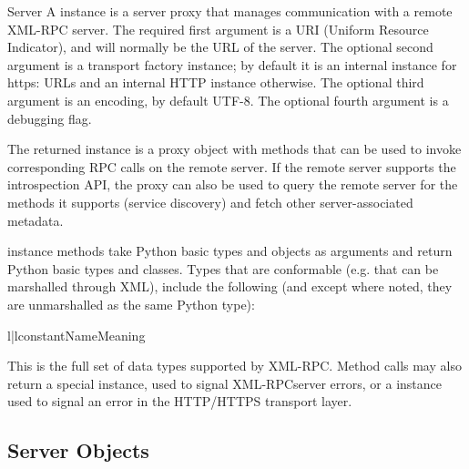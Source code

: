 \begin{classdesc}{Server}{}
A  instance is a server proxy that manages communication
with a remote XML-RPC server.  The required first argument is a URI
(Uniform Resource Indicator), and will normally be the URL of the
server.  The optional second argument is a transport factory instance;
by default it is an internal  instance for https:
URLs and an internal HTTP  instance otherwise.  The
optional third argument is an encoding, by default UTF-8. The optional
fourth argument is a debugging flag.

The returned instance is a proxy object with methods that can be used
to invoke corresponding RPC calls on the remote server.  If the remote
server supports the introspection API, the proxy can also be used to query
the remote server for the methods it supports (service discovery) and
fetch other server-associated metadata.

 instance methods take Python basic types and objects as 
arguments and return Python basic types and classes.  Types that are
conformable (e.g. that can be marshalled through XML), include the
following (and except where noted, they are unmarshalled as the same
Python type):

\begin{tableii}{l|l}{constant}{Name}{Meaning}
\end{tableii}

This is the full set of data types supported by XML-RPC.  Method calls
may also return a special  instance, used to signal XML-RPCserver
errors, or a  instance used to signal an error in
the HTTP/HTTPS transport layer.

\end{classdesc}

\subsection{Server Objects \label{server-objects}}

